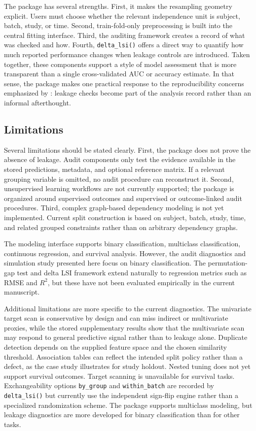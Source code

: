 \documentclass[article]{jss}
\begin{document}
The package has several strengths. First, it makes the resampling geometry
explicit. Users must choose whether the relevant independence unit is subject,
batch, study, or time. Second, train-fold-only preprocessing is built into the
central fitting interface. Third, the auditing framework creates a record of
what was checked and how. Fourth, \texttt{delta\_lsi()} offers a direct way to
quantify how much reported performance changes when leakage controls are
introduced. Taken together, these components support a style of model
assessment that is more transparent than a single cross-validated AUC or
accuracy estimate. In that sense, the package makes one practical response to
the reproducibility concerns emphasized by \citet{kapoor2023}: leakage
checks become part of the analysis record rather than an informal afterthought.

\subsection{Limitations}

Several limitations should be stated clearly. First, the package does not prove
the absence of leakage. Audit components only test the evidence available in
the stored predictions, metadata, and optional reference matrix. If a relevant
grouping variable is omitted, no audit procedure can reconstruct it. Second,
unsupervised learning workflows are not currently supported; the package is
organized around supervised outcomes and supervised or outcome-linked audit
procedures. Third, complex graph-based dependency modeling is not yet
implemented. Current split construction is based on subject, batch, study,
time, and related grouped constraints rather than on arbitrary dependency
graphs.

The modeling interface supports binary classification, multiclass
classification, continuous regression, and survival analysis. However, the
audit diagnostics and simulation study presented here focus on binary
classification. The permutation-gap test and delta LSI framework extend
naturally to regression metrics such as RMSE and $R^2$, but these have not
been evaluated empirically in the current manuscript.

Additional limitations are more specific to the current diagnostics. The
univariate target scan is conservative by design and can miss indirect or
multivariate proxies, while the stored supplementary results show that the
multivariate scan may respond to general predictive signal rather than to
leakage alone. Duplicate detection depends on the supplied feature space and
the chosen similarity threshold. Association tables can reflect the intended
split policy rather than a defect, as the case study illustrates for study
holdout. Nested tuning does not yet support survival outcomes. Target scanning
is unavailable for survival tasks. Exchangeability options
\texttt{by\_group} and \texttt{within\_batch} are recorded by
\texttt{delta\_lsi()} but currently use the independent sign-flip engine rather
than a specialized randomization scheme. The package supports multiclass
modeling, but leakage diagnostics are more developed for binary classification
than for other tasks.
\end{document}
